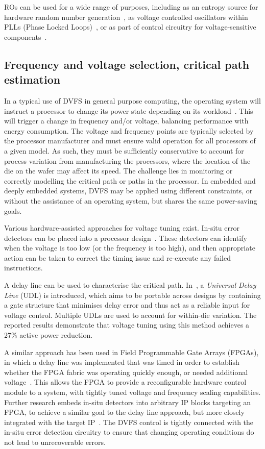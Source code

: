 \documentclass[a4paper,twocolumn,DIV=16]{scrartcl}
\begin{document}
ROs can be used for a wide range of purposes, including as an entropy source for
hardware random number generation~\cite{XMOS2010a}, as voltage controlled
oscillators within PLLs (Phase Locked Loops)~\cite{Weigandt1994}, or as part of
control circuitry for voltage-sensitive components~\cite{burd2000scaled}.

\subsection{Frequency and voltage selection, critical path estimation}

In a typical use of DVFS in general purpose computing, the operating system will
instruct a processor to change its power state depending on its
workload~\cite{linuxgov2013}. This will trigger a change in frequency and/or
voltage, balancing performance with energy consumption. The voltage and
frequency points are typically selected by the processor manufacturer and must
ensure valid operation for all processors of a given model. As such, they must
be sufficiently conservative to account for process variation from manufacturing
the processors, where the location of the die on the wafer may affect its speed.
The challenge lies in monitoring or correctly modelling the critical path or
paths in the processor. In embedded and deeply embedded systems, DVFS may be
applied using different constraints, or without the assistance of an operating
system, but shares the same power-saving goals.

Various hardware-assisted approaches for voltage tuning exist. In-situ error
detectors can be placed into a processor design~\cite{das2006dvstuning}. These
detectors can identify when the voltage is too low (or the frequency is too
high), and then appropriate action can be taken to correct the timing issue and
re-execute any failed instructions.

A delay line can be used to characterise the critical path.
In~\cite{Ikenaga2011}, a \emph{Universal Delay Line} (UDL) is introduced, which
aims to be portable across designs by containing a gate structure that minimises
delay error and thus act as a reliable input for voltage control. Multiple UDLs
are used to account for within-die variation. The reported results demonstrate
that voltage tuning using this method achieves a 27\% active power reduction.

A similar approach has been used in Field Programmable Gate Arrays (FPGAs), in
which a delay line was implemented that was timed in order to establish whether
the FPGA fabric was operating quickly enough, or needed additional
voltage~\cite{Nabina2012}. This allows the FPGA to provide a reconfigurable
hardware control module to a system, with tightly tuned voltage and frequency
scaling capabilities. Further research embeds in-situ detectors into arbitrary
IP blocks targeting an FPGA, to achieve a similar goal to the delay line
approach, but more closely integrated with the target IP~\cite{Nunez-Yanez2013}.
The DVFS control is tightly connected with the in-situ error detection circuitry
to ensure that changing operating conditions do not lead to unrecoverable
errors.
\end{document}
